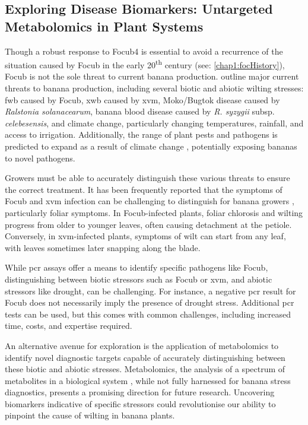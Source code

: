 \subsection{Exploring Disease Biomarkers: Untargeted Metabolomics in Plant Systems}
\label{section:BiomakerIntro}

Though a robust response to \ac{Focub4} is essential to avoid a recurrence of the situation caused by \ac{Focub} in the early 20\textsuperscript{th} century (see: \ref{chap1:focHistory}), \ac{Focub} is not the sole threat to current banana production. \textcite{Ploetz2015c, Bebber2023} outline major current threats to banana production, including several biotic and abiotic wilting stresses: \acf{fwb} caused by \ac{Focub}, \acf{xwb} caused by \acf{xvm}, Moko/Bugtok disease caused by \textit{Ralstonia solanacearum}, banana blood disease caused by \textit{R. syzygii} subsp. \textit{celebesensis}, and climate change, particularly changing temperatures, rainfall, and access to irrigation. Additionally, the range of plant pests and pathogens is predicted to expand as a result of climate change \parencite{Bebber2015}, potentially exposing bananas to novel pathogens.

Growers must be able to accurately distinguish these various threats to ensure the correct treatment. It has been frequently reported that the symptoms of \ac{Focub} and \ac{xvm} infection can be challenging to distinguish for banana growers \parencite{Stellenbosch24, PromusaSymps, Biruma2007}, particularly foliar symptoms. In \ac{Focub}-infected plants, foliar chlorosis and wilting progress from older to younger leaves, often causing detachment at the petiole. Conversely, in \ac{xvm}-infected plants, symptoms of wilt can start from any leaf, with leaves sometimes later snapping along the blade. 

While \ac{pcr} assays offer a means to identify specific pathogens like \ac{Focub}, distinguishing between biotic stressors such as \ac{Focub} or \ac{xvm}, and abiotic stressors like drought, can be challenging. For instance, a negative \ac{pcr} result for \ac{Focub} does not necessarily imply the presence of drought stress. Additional \ac{pcr} tests can be used, but this comes with common challenges, including increased time, costs, and expertise required.

An alternative avenue for exploration is the application of metabolomics to identify novel diagnostic targets capable of accurately distinguishing between these biotic and abiotic stresses. Metabolomics, the analysis of a spectrum of metabolites in a biological system \parencite{Klassen2017}, while not fully harnessed for banana stress diagnostics, presents a promising direction for future research. Uncovering biomarkers indicative of specific stressors could revolutionise our ability to pinpoint the cause of wilting in banana plants.

